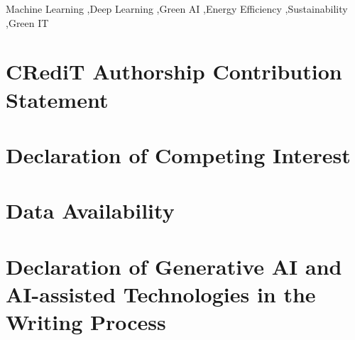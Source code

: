\documentclass[a4paper,fleqn]{cas-dc}
\begin{document}
\begin{keywords}
Machine Learning \sep Deep Learning \sep Green AI \sep Energy Efficiency \sep Sustainability \sep Green IT
\end{keywords}


\begin{abstract}\newline
\AbstractText
\end{abstract}


\maketitle


\appendix
{}


\section*{CRediT Authorship Contribution Statement}

\CreditStatement

\section*{Declaration of Competing Interest}

\CompetingInterestStatement

\section*{Data Availability}

\DataAvailabilityStatement

\section*{Declaration of Generative AI and AI-assisted Technologies in the Writing Process}
\GenerativeAIStatement

\balance


\end{document}
